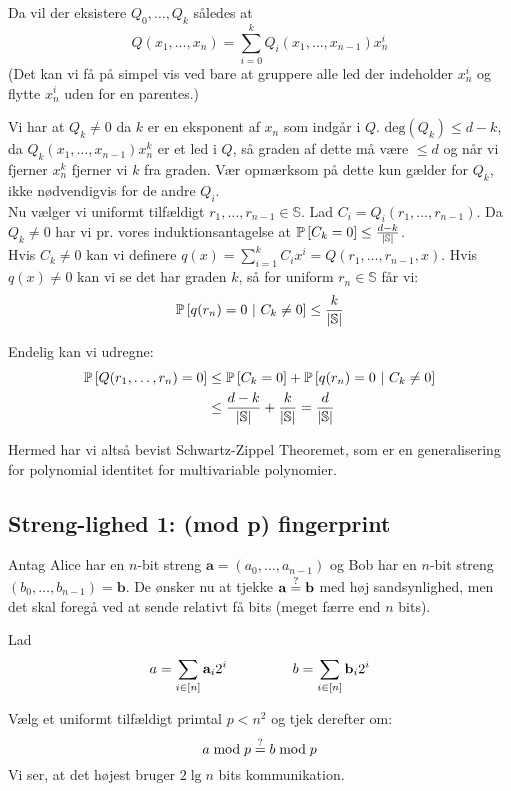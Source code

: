 Da vil der eksistere $Q_0, \dots, Q_k$ således at
$$
  Q(x_1, \dots, x_n) = \sum_{i=0}^k Q_i (x_1, \dots, x_{n-1}) x_n^i
$$
(Det kan vi få på simpel vis ved bare at gruppere alle led der indeholder $x_n^i$ og flytte $x_n^i$ uden for en parentes.)

Vi har at $Q_k \neq 0$ da $k$ er en eksponent af $x_n$ som indgår i $Q$. $\text{deg}(Q_k) \leq d - k$, da $Q_k (x_1, \dots, x_{n-1})x_n^k$ er et led i $Q$, så graden af dette må være $\leq d$ og når vi fjerner $x_n^k$ fjerner vi $k$ fra graden. Vær opmærksom på dette kun gælder for $Q_k$, ikke nødvendigvis for de andre $Q_i$.\\


Nu vælger vi uniformt tilfældigt $r_1, \dots, r_{n-1} \in \mathbb S$. Lad $C_i = Q_i(r_1, \dots, r_{n-1})$. Da $Q_k \neq 0$ har vi pr. vores induktionsantagelse at $\P{C_k = 0} \leq \frac{d - k}{|\mathbb S|}$.\\

Hvis $C_k \neq 0$ kan vi definere $q(x) = \sum_{i=1}^k C_i x^i = Q(r_1, \dots, r_{n-1}, x)$. Hvis $q(x) \neq 0$ kan vi se det har graden $k$, så for uniform $r_n \in \mathbb S$ får vi:
$$
\P{q(r_n) = 0 \ | C_k \neq 0} \leq \frac{k}{|\mathbb S|}
$$

Endelig kan vi udregne:
\begin{align}
  \P{Q(r_1, \dots, r_n) = 0}
  &\leq \P{C_k = 0} + \P{q(r_n) = 0 | C_k \neq 0}\\
  &\leq \frac{d - k}{|\mathbb S|} + \frac{k}{|\mathbb S|} = \frac{d}{|\mathbb S|}
\end{align}

Hermed har vi altså bevist Schwartz-Zippel Theoremet, som er en generalisering for polynomial identitet for multivariable polynomier.


\subsection{Streng-lighed 1: (mod p) fingerprint}
Antag Alice har en $n$-bit streng $\mathbf a = (a_0, \dots, a_{n-1})$ og Bob har en $n$-bit streng $(b_0, \dots, b_{n-1}) = \mathbf b$. De ønsker nu at tjekke $\mathbf a \? \mathbf b$ med høj sandsynlighed, men det skal foregå ved at sende relativt få bits (meget færre end $n$ bits).

Lad
$$
  a = \sum_{i \in [n]} \mathbf a_i 2^i
  \longspace
  b = \sum_{i \in [n]} \mathbf b_i 2^i
$$

Vælg et uniformt tilfældigt primtal $p < n^2$ og tjek derefter om:
$$
  a \bmod p \? b \bmod p
$$
Vi ser, at det højest bruger $2 \lg n$ bits kommunikation.



